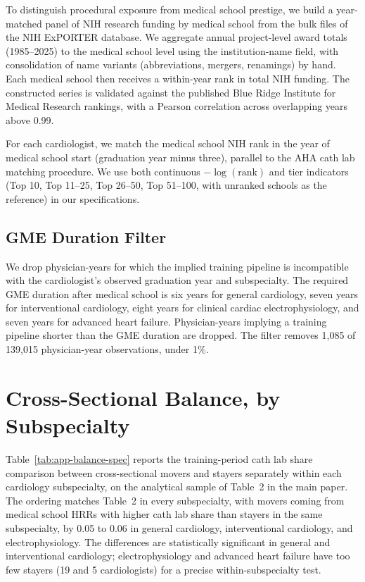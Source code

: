 \documentclass[12pt]{article}
\begin{document}
To distinguish procedural exposure from medical school prestige, we build a year-matched panel of NIH research funding by medical school from the bulk files of the NIH ExPORTER database. We aggregate annual project-level award totals (1985--2025) to the medical school level using the institution-name field, with consolidation of name variants (abbreviations, mergers, renamings) by hand. Each medical school then receives a within-year rank in total NIH funding. The constructed series is validated against the published Blue Ridge Institute for Medical Research rankings, with a Pearson correlation across overlapping years above 0.99.

For each cardiologist, we match the medical school NIH rank in the year of medical school start (graduation year minus three), parallel to the AHA cath lab matching procedure. We use both continuous $-\log(\text{rank})$ and tier indicators (Top 10, Top 11--25, Top 26--50, Top 51--100, with unranked schools as the reference) in our specifications.

\subsection{GME Duration Filter}

We drop physician-years for which the implied training pipeline is incompatible with the cardiologist's observed graduation year and subspecialty. The required GME duration after medical school is six years for general cardiology, seven years for interventional cardiology, eight years for clinical cardiac electrophysiology, and seven years for advanced heart failure. Physician-years implying a training pipeline shorter than the GME duration are dropped. The filter removes 1,085 of 139,015 physician-year observations, under 1\%.

\section{Cross-Sectional Balance, by Subspecialty}\label{sec:app-balance}

Table~\ref{tab:app-balance-spec} reports the training-period cath lab share comparison between cross-sectional movers and stayers separately within each cardiology subspecialty, on the analytical sample of Table~2 in the main paper. The ordering matches Table~2 in every subspecialty, with movers coming from medical school HRRs with higher cath lab share than stayers in the same subspecialty, by 0.05 to 0.06 in general cardiology, interventional cardiology, and electrophysiology. The differences are statistically significant in general and interventional cardiology; electrophysiology and advanced heart failure have too few stayers (19 and 5 cardiologists) for a precise within-subspecialty test.
\end{document}
